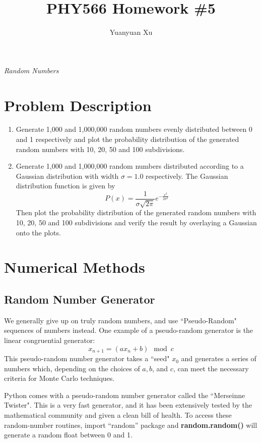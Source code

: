 \documentclass[a4paper]{article}
\title{\textbf{PHY566 Homework \#5}}
\author{Yuanyuan Xu}
\begin{document}
	\maketitle
	\centerline{\emph{\Large{Random Numbers}}}
	\section{Problem Description}
	\begin{enumerate}[label=\alph*)]
		\item Generate 1,000 and 1,000,000 random numbers evenly distributed between 0 and 1 respectively and plot the probability distribution of the generated random numbers with 10, 20, 50 and 100 subdivisions.	
		\item Generate 1,000 and 1,000,000 random numbers distributed according to a Gaussian distribution with width $\sigma = 1.0$ respectively. The Gaussian distribution function is given by
		$$
			P(x) = \frac{1}{\sigma \sqrt{2\pi}}e^{-\frac{x^2}{2\sigma ^{2}}}
		$$
		Then plot the probability distribution of the generated random numbers with 10, 20, 50 and 100 subdivisions and verify the result by overlaying a Gaussian onto the plots.
	\end{enumerate}
	\newpage
	\section{Numerical Methods}
	\subsection{Random Number Generator}
	We generally give up on truly random numbers, and use ``Pseudo-Random" sequences of numbers instead. One example of a pseudo-random generator is the linear congruential generator:
	\begin{equation}
		x_{n+1} = (ax_n + b) \mod c
	\end{equation}
	This pseudo-random number generator takes a ``seed" $x_0$ and generates a series of numbers which, depending on the choices of $a, b$, and $c$, can meet the necessary criteria for Monte Carlo techniques.
	
	Python comes with a pseudo-random number generator called the ``Merseinne Twister". This is a very fast generator, and it has been extensively tested by the mathematical community and given a clean bill of health. To access these random-number routines, import ``random'' package and \textbf{random.random()} will generate a random float between 0 and 1.
\end{document}
